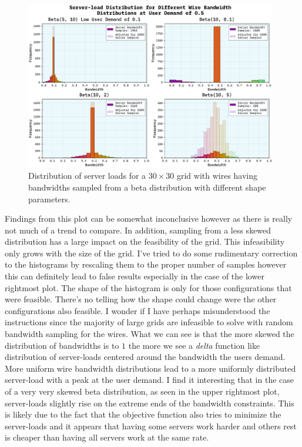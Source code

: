 \documentclass[10pt, titlepage, a4paper]{article}
\begin{document}
\begin{figure}[H]
    \centering
    \includegraphics[width=0.98\textwidth]{../Images/bandwidth-dist.pdf}
    \caption{Distribution of server loads for a $30\times 30$ grid with wires having bandwidths sampled from a beta distribution with different shape parameters.}
    \label{fig:server-load}
\end{figure}

Findings from this plot can be somewhat inconclusive however as there is really not much of a trend to compare. In addition, sampling from a less skewed distribution
has a large impact on the feasibility of the grid. This infeasibility only grows with the size of the grid. I've tried to do some rudimentary correction to the histograms 
by rescaling them to the proper number of samples however this can definitely lead to false results especially in the case of the lower rightmost plot. The shape of the 
histogram is only for those configurations that were feasible. There's no telling how the shape could change were the other configurations also feasible. I wonder if I have perhaps 
misunderstood the instructions since the majority of large grids are infeasible to solve with random bandwidth sampling for the wires.
What we can see is that the more skewed the distribution of bandwidths is to $1$ the more we see a \textit{delta} function like distribution
of server-loads centered around the bandwidth the users demand. More uniform wire bandwidth distributions lead to a more uniformly distributed 
server-load with a peak at the user demand. I find it interesting that in the case of a very very skewed beta distribution, as seen in the 
upper rightmost plot, server-loads slightly rise on the extreme ends of the bandwidth constraints. This is likely due to the fact that the
objective function also tries to minimize the server-loads and it appears that having some servers work harder and others rest is 
cheaper than having all servers work at the same rate. \\
\end{document}
